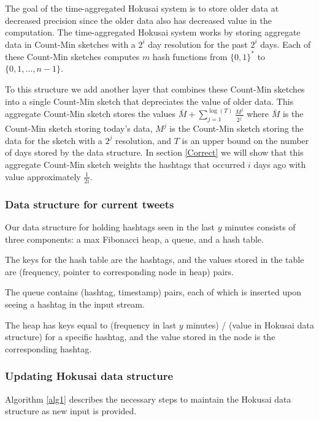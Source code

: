 \documentclass[a4paper,12pt]{article}
\begin{document}
The goal of the time-aggregated Hokusai system is to store older data at decreased precision since the older data also has decreased value in the computation.  The time-aggregated Hokusai system works by storing aggregate data in Count-Min sketches with a $2^i$ day resolution for the past $2^i$ days.  Each of these Count-Min sketches computes $m$ hash functions from $\{0,1\}^*$ to $\{0, 1, …, n-1\}$.

To this structure we add another layer that combines these Count-Min sketches into a single Count-Min sketch that depreciates the value of older data.  This aggregate Count-Min sketch stores the values $\bar{M} + \sum\limits_{j=1}^{\log⁡(T)} \frac{M^j}{2^j}$ where $\bar{M}$ is the Count-Min sketch storing today's data, $M^j$ is the Count-Min sketch storing the data for the sketch with a $2^j$ resolution, and $T$ is an upper bound on the number of days stored by the data structure.  In section \ref{Correct} we will show that this aggregate Count-Min sketch weights the hashtags that occurred $i$ days ago with value approximately $\frac{1}{2i}$.

\subsubsection{Data structure for current tweets}

Our data structure for holding hashtags seen in the last $y$ minutes consists of three components: a max Fibonacci heap, a queue, and a hash table.

The keys for the hash table are the hashtags, and the values stored in the table are (frequency, pointer to corresponding node in heap) pairs.

The queue contains (hashtag, timestamp) pairs, each of which is inserted upon seeing a hashtag in the input stream.

The heap has keys equal to (frequency in last $y$ minutes) / (value in Hokusai data structure) for a specific hashtag, and the value stored in the node is the corresponding hashtag.

\subsubsection{Updating Hokusai data structure\label{Hokusai}}

Algorithm \ref{alg1} describes the necessary steps to maintain the Hokusai data structure as new input is provided.
\end{document}
